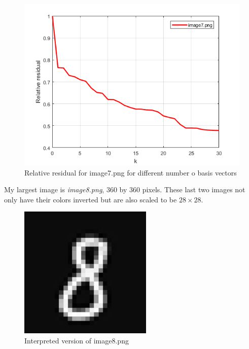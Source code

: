 \documentclass[notitlepage]{report}
\begin{document}
\begin{figure}[!ht]
\centering
\includegraphics[scale=0.65]{image7graph.png}
\caption{Relative residual for image7.png for different number o basis vectors}
\label{graph7}
\end{figure}

My largest image is \textit{image8.png}, $360$ by $360$ pixels. These last two images not only have their colors inverted but are also scaled to be $28 \times 28$.
\begin{figure}[!ht]
\centering
\includegraphics[scale=0.4]{output8.png}
\caption{Interpreted version of image8.png}
\label{out8}
\end{figure}
\end{document}
